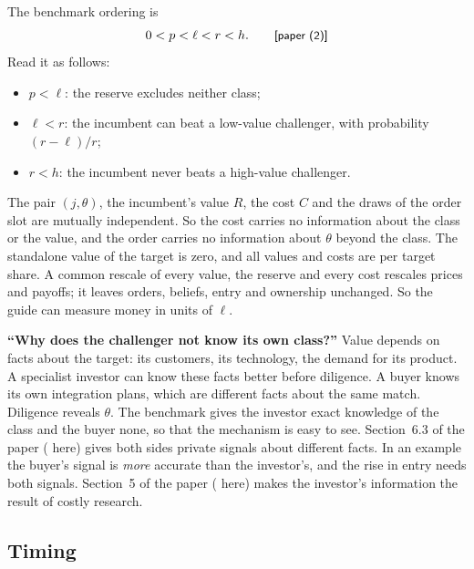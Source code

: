 The benchmark ordering is
\[
0<p<\ell<r<h. \tag*{\paper{(2)}}
\]
Read it as follows:
\begin{itemize}
\item \(p<\ell\): the reserve excludes neither class;
\item \(\ell<r\): the incumbent can beat a low-value challenger, with probability \((r-\ell)/r\);
\item \(r<h\): the incumbent never beats a high-value challenger.
\end{itemize}

The pair \((j,\theta)\), the incumbent's value \(R\), the cost \(C\) and the draws of the order slot are
mutually independent. So the cost carries no information about the class or the value, and the order
carries no information about \(\theta\) beyond the class. The standalone value of the target is zero, and
all values and costs are per target share. A common rescale of every value, the reserve and every cost
rescales prices and payoffs; it leaves orders, beliefs, entry and ownership unchanged. So the guide can
measure money in units of \(\ell\).

\begin{panelnote}
\textbf{``Why does the challenger not know its own class?''} Value depends on facts about the target:
its customers, its technology, the demand for its product. A specialist investor can know these facts
better before diligence. A buyer knows its own integration plans, which are different facts about the
same match. Diligence reveals \(\theta\). The benchmark gives the investor exact knowledge of the class
and the buyer none, so that the mechanism is easy to see. Section~6.3 of the paper
( here) gives both sides private signals about different facts. In an
example the buyer's signal is \emph{more} accurate than the investor's, and the rise in entry needs both
signals. Section~5 of the paper ( here) makes the investor's information the
result of costly research.
\end{panelnote}

\subsection{Timing}\label{sec:02_model-timing}

